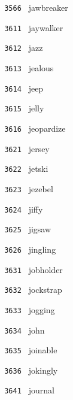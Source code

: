 \documentclass[11pt]{article}
\begin{document}
\begin{multicols}{6}
\noindent \texttt{ 3566 } \hspace{1mm} jawbreaker  \par
\noindent \texttt{ 3611 } \hspace{1mm} jaywalker  \par
\noindent \texttt{ 3612 } \hspace{1mm} jazz  \par
\noindent \texttt{ 3613 } \hspace{1mm} jealous  \par
\noindent \texttt{ 3614 } \hspace{1mm} jeep  \par
\noindent \texttt{ 3615 } \hspace{1mm} jelly  \par
\noindent \texttt{ 3616 } \hspace{1mm} jeopardize  \par
\noindent \texttt{ 3621 } \hspace{1mm} jersey  \par
\noindent \texttt{ 3622 } \hspace{1mm} jetski  \par
\noindent \texttt{ 3623 } \hspace{1mm} jezebel  \par
\noindent \texttt{ 3624 } \hspace{1mm} jiffy  \par
\noindent \texttt{ 3625 } \hspace{1mm} jigsaw  \par
\noindent \texttt{ 3626 } \hspace{1mm} jingling  \par
\noindent \texttt{ 3631 } \hspace{1mm} jobholder  \par
\noindent \texttt{ 3632 } \hspace{1mm} jockstrap  \par
\noindent \texttt{ 3633 } \hspace{1mm} jogging  \par
\noindent \texttt{ 3634 } \hspace{1mm} john  \par
\noindent \texttt{ 3635 } \hspace{1mm} joinable  \par
\noindent \texttt{ 3636 } \hspace{1mm} jokingly  \par
\noindent \texttt{ 3641 } \hspace{1mm} journal  \par

\end{multicols}
\end{document}
